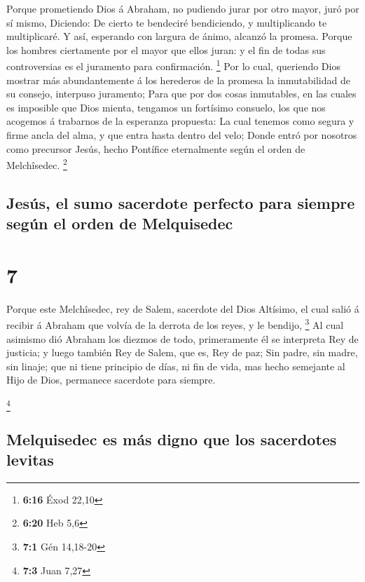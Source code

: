  Porque prometiendo Dios á Abraham, no pudiendo jurar por
otro mayor, juró por sí mismo,  Diciendo: De cierto te
bendeciré bendiciendo, y multiplicando te multiplicaré.  Y
así, esperando con largura de ánimo, alcanzó la promesa. 
Porque los hombres ciertamente por el mayor que ellos juran: y el fin de
todas sus controversias es el juramento para confirmación. \footnote{\textbf{6:16}
  Éxod 22,10}  Por lo cual, queriendo Dios mostrar más
abundantemente á los herederos de la promesa la inmutabilidad de su
consejo, interpuso juramento;  Para que por dos cosas
inmutables, en las cuales es imposible que Dios mienta, tengamos un
fortísimo consuelo, los que nos acogemos á trabarnos de la esperanza
propuesta:  La cual tenemos como segura y firme ancla del
alma, y que entra hasta dentro del velo;  Donde entró por
nosotros como precursor Jesús, hecho Pontífice eternalmente según el
orden de Melchîsedec. \footnote{\textbf{6:20} Heb 5,6}

\hypertarget{jesuxfas-el-sumo-sacerdote-perfecto-para-siempre-seguxfan-el-orden-de-melquisedec}{%
\subsection{Jesús, el sumo sacerdote perfecto para siempre según el
orden de
Melquisedec}\label{jesuxfas-el-sumo-sacerdote-perfecto-para-siempre-seguxfan-el-orden-de-melquisedec}}

\hypertarget{section-6}{%
\section{7}\label{section-6}}

 Porque este Melchîsedec, rey de Salem, sacerdote del Dios
Altísimo, el cual salió á recibir á Abraham que volvía de la derrota de
los reyes, y le bendijo, \footnote{\textbf{7:1} Gén 14,18-20}
 Al cual asimismo dió Abraham los diezmos de todo,
primeramente él se interpreta Rey de justicia; y luego también Rey de
Salem, que es, Rey de paz;  Sin padre, sin madre, sin
linaje; que ni tiene principio de días, ni fin de vida, mas hecho
semejante al Hijo de Dios, permanece sacerdote para siempre.

\footnote{\textbf{7:3} Juan 7,27}

\hypertarget{melquisedec-es-muxe1s-digno-que-los-sacerdotes-levitas}{%
\subsection{Melquisedec es más digno que los sacerdotes
levitas}\label{melquisedec-es-muxe1s-digno-que-los-sacerdotes-levitas}}

